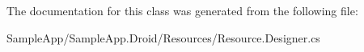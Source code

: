 The documentation for this class was generated from the following file\+:\begin{DoxyCompactItemize}
\item 
Sample\+App/\+Sample\+App.\+Droid/\+Resources/Resource.\+Designer.\+cs\end{DoxyCompactItemize}
